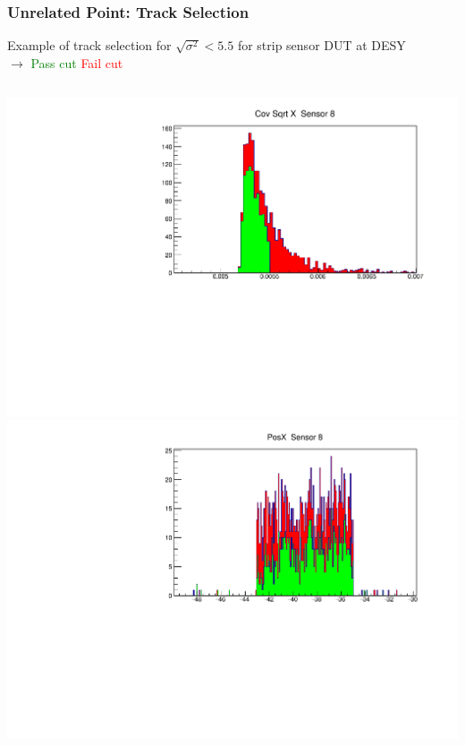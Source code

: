 \documentclass{beamer}
\begin{document}
\begin{frame}
\frametitle{Unrelated Point: Track Selection}
Example of track selection for $\sqrt{\sigma^{2}}<5.5$ for strip sensor DUT at DESY \\ $\rightarrow$ \textcolor{green}{Pass cut}  \textcolor{red}{Fail cut}
\begin{columns}[t]
\centering
\includegraphics[width=1\linewidth]{pics/covXCut-5_5Micron.pdf}\\
\includegraphics[width=1\linewidth]{pics/posX-Cut5_5MicronErr.pdf}\\
\centering

\end{columns}
\end{frame}
\end{document}
